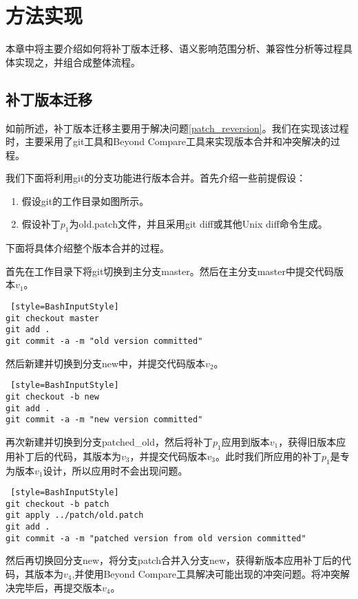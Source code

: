 \chapter{方法实现}
本章中将主要介绍如何将补丁版本迁移、语义影响范围分析、兼容性分析等过程具体实现之，并组合成整体流程。

\section{补丁版本迁移}

如前所述，补丁版本迁移主要用于解决问题\ref {patch_reversion}。我们在实现该过程时，主要采用了git工具和Beyond Compare工具来实现版本合并和冲突解决的过程。

我们下面将利用git的分支功能进行版本合并。首先介绍一些前提假设：

\begin{enumerate}
	\item 假设git的工作目录如图所示。

	\item 假设补丁$p_1$为old.patch文件，并且采用git diff或其他Unix diff命令生成。
\end{enumerate}

下面将具体介绍整个版本合并的过程。


首先在工作目录下将git切换到主分支master。然后在主分支master中提交代码版本$v_1$。

\begin{lstlisting} [style=BashInputStyle]
git checkout master
git add .
git commit -a -m "old version committed"
\end{lstlisting}

然后新建并切换到分支new中，并提交代码版本$v_2$。
\begin{lstlisting} [style=BashInputStyle]
git checkout -b new
git add .
git commit -a -m "new version committed"
\end{lstlisting}

再次新建并切换到分支patched\_old，然后将补丁$p_1$应用到版本$v_1$，获得旧版本应用补丁后的代码，其版本为$v_3$，并提交代码版本$v_3$。此时我们所应用的补丁$p_1$是专为版本$v_1$设计，所以应用时不会出现问题。

\begin{lstlisting} [style=BashInputStyle]
git checkout -b patch
git apply ../patch/old.patch
git add .
git commit -a -m "patched version from old version committed"
\end{lstlisting}

然后再切换回分支new，将分支patch合并入分支new，获得新版本应用补丁后的代码，其版本为$v_4$,并使用Beyond Compare工具解决可能出现的冲突问题。将冲突解决完毕后，再提交版本$v_4$。

